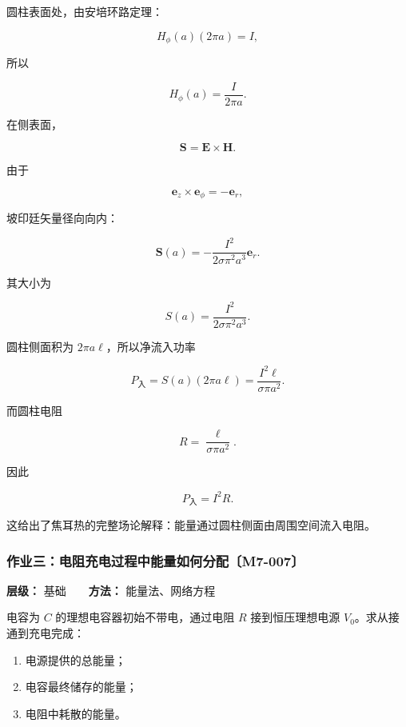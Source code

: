 圆柱表面处，由安培环路定理：

\[
H_{\phi}(a)(2\pi a)=I,
\]

所以

\[
\boxed{H_{\phi}(a)=\frac{I}{2\pi a}}.
\]

在侧表面，

\[
\mathbf S
=\mathbf E\times\mathbf H.
\]

由于

\[
\mathbf e_z\times\mathbf e_{\phi}=-\mathbf e_r,
\]

坡印廷矢量径向向内：

\[
\boxed{
\mathbf S(a)
=-\frac{I^2}
{2\sigma\pi^2a^3}\mathbf e_r
}.
\]

其大小为

\[
S(a)
=\frac{I^2}
{2\sigma\pi^2a^3}.
\]

圆柱侧面积为 \(2\pi a\ell\)，所以净流入功率

\[
P_{\mathrm{\text{入}}}
=S(a)(2\pi a\ell)
=\frac{I^2\ell}{\sigma\pi a^2}.
\]

而圆柱电阻

\[
R=\frac{\ell}{\sigma\pi a^2}.
\]

因此

\[
\boxed{P_{\mathrm{\text{入}}}=I^2R}.
\]

这给出了焦耳热的完整场论解释：能量通过圆柱侧面由周围空间流入电阻。

\par{}
\noindent\begin{minipage}{\linewidth}

\subsubsection{作业三：电阻充电过程中能量如何分配〔M7-007〕}\label{m7:ux4f5cux4e1aux4e09ux7535ux963bux5145ux7535ux8fc7ux7a0bux4e2dux80fdux91cfux5982ux4f55ux5206ux914dm7-007}

\textbf{层级：} 基础　　\textbf{方法：} 能量法、网络方程

电容为 \(C\) 的理想电容器初始不带电，通过电阻 \(R\) 接到恒压理想电源
\(V_0\)。求从接通到充电完成：

\begin{enumerate}
\def\labelenumi{\arabic{enumi}.}
\tightlist
\item
  电源提供的总能量；
\item
  电容最终储存的能量；
\item
  电阻中耗散的能量。
\end{enumerate}

\end{minipage}\par

